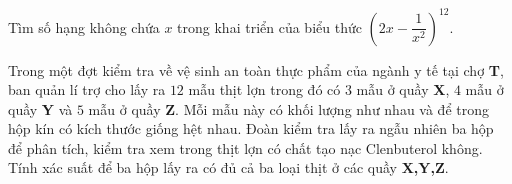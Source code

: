 \begin{bt}%
Tìm số hạng không chứa $x$ trong khai triển của biểu thức $\left (2x-\dfrac{1}{x^2}\right )^{12}.$
\end{bt}
\begin{bt}%
Trong một đợt kiểm tra về vệ sinh an toàn thực phẩm của ngành y tế tại chợ \textbf{T}, ban quản lí trợ cho lấy ra $12$ mẫu thịt lợn trong đó có $3$ mẫu ở quầy \textbf{X}, $4$ mẫu ở quầy \textbf{Y} và $5$ mẫu ở quầy \textbf{Z}. Mỗi mẫu này có khối lượng như nhau và để trong hộp kín có kích thước giống hệt nhau. Đoàn kiểm tra lấy ra ngẫu nhiên ba hộp để phân tích, kiểm tra xem trong thịt lợn có chất tạo nạc Clenbuterol không. Tính xác suất để ba hộp lấy ra có đủ cả ba loại thịt ở các quầy \textbf{X,Y,Z}.
\end{bt}
